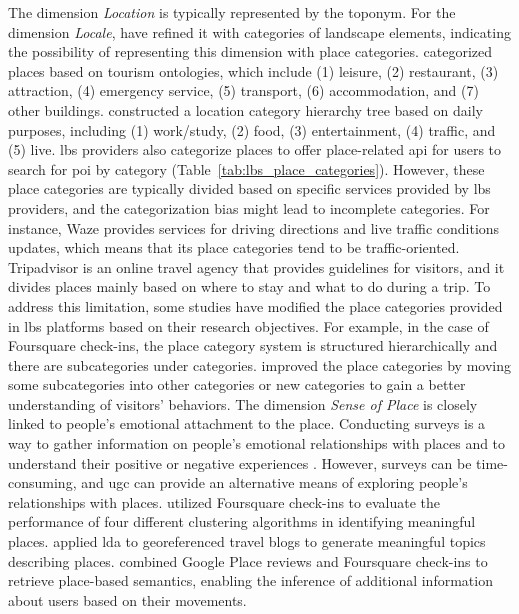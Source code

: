 \documentclass{article}
\theoremstyle{remark}
\begin{document}
The dimension \textit{Location} is typically represented by the toponym. For the dimension \textit{Locale}, 
\cite{wartmann_characterizing_2016,wartmann_describing_2018} have refined it with categories of landscape elements, indicating the possibility of representing this dimension with place categories. \cite{koirala_social_2015} categorized places based on tourism ontologies, which include (1) leisure, (2) restaurant, (3) attraction, (4) emergency service, (5) transport, (6) accommodation, and (7) other buildings. \cite{liu_stccd_2020} constructed a location category hierarchy tree based on daily purposes, including (1) work/study, (2) food, (3) entertainment, (4) traffic, and (5) live. \acrfull{lbs} providers also categorize places to offer place-related \acrshort{api} for users to search for \acrshort{poi} by category (Table~\ref{tab:lbs_place_categories}). However, these place categories are typically divided based on specific services provided by \acrshort{lbs} providers, and the categorization bias might lead to incomplete categories. For instance, Waze provides services for driving directions and live traffic conditions updates, which means that its place categories tend to be traffic-oriented. Tripadvisor is an online travel agency that provides guidelines for visitors, and it divides places mainly based on where to stay and what to do during a trip. To address this limitation, some studies have modified the place categories provided in \acrshort{lbs} platforms based on their research objectives. For example, in the case of Foursquare check-ins, the place category system is structured hierarchically and there are subcategories under categories. \cite{ferreira_uncovering_2020,yang_identifying_2021} improved the place categories by moving some subcategories into other categories or new categories to gain a better understanding of visitors' behaviors. The dimension \textit{Sense of Place} is closely linked to people's emotional attachment to the place. Conducting surveys is a way to gather information on people's emotional relationships with places and to understand their positive or negative experiences \citep{manzo_for_2005}. However, surveys can be time-consuming, and \acrshort{ugc} can provide an alternative means of exploring people's relationships with places. \cite{wang_using_2015} utilized Foursquare check-ins to evaluate the performance of four different clustering algorithms in identifying meaningful places. \cite{sui_inferring_2013} applied \acrshort{lda} to georeferenced travel blogs to generate meaningful topics describing places. \cite{hallot_who_2015} combined Google Place reviews and Foursquare check-ins to retrieve place-based semantics, enabling the inference of additional information about users based on their movements.
\end{document}
